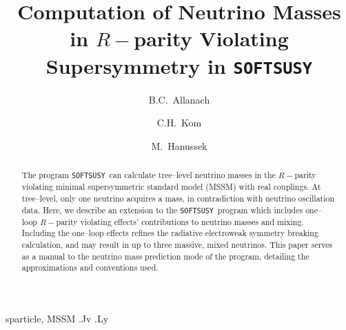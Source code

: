 \documentclass[pdflatex,final,3p,times]{elsarticle}
\def\SOFTSUSY{{\tt SOFTSUSY}}
\begin{document}
\begin{frontmatter}

\title{Computation of Neutrino Masses in $R-$parity Violating Supersymmetry in \SOFTSUSY}

\author[damtp]{B.C.~Allanach}\author[damtp,cav]{C.H.~Kom}
\author[bonn]{M.~Hanussek}
\address[damtp]{DAMTP, CMS, University of Cambridge, Wilberforce road,
  Cambridge, CB3 0WA, United Kingdom}
\address[cav]{The Cavendish Laboratory, J J Thomson Ave, University of
  Cambridge, 
  Cambridge, CB3 0HE, United Kingdom}
\address[bonn]{Bethe Center of Theoretical Physics, University of Bonn, Nussallee 12, D-53115
  Bonn, Germany}
\begin{abstract}
  The program {\tt SOFTSUSY}~can calculate tree--level neutrino masses
  in the $R-$parity violating minimal supersymmetric standard model
  (MSSM) with real couplings. At tree--level, only one neutrino acquires a
  mass, in  
  contradiction with neutrino oscillation data.  Here, we describe an
  extension to the {\tt SOFTSUSY}~program which includes one--loop
  $R-$parity violating effects' contributions to neutrino masses and
  mixing. Including the one--loop effects refines the radiative
  electroweak symmetry breaking calculation, and may result in up to
  three massive, mixed neutrinos.  This paper serves as a manual to
  the neutrino mass prediction mode of the program, detailing the
  approximations and conventions used.
\end{abstract}

\begin{keyword}
sparticle, MSSM
.Jv
.Ly
\end{keyword}
\end{frontmatter}
\end{document}
